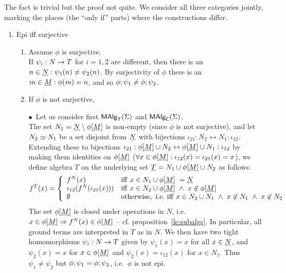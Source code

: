 \documentclass[10pt]{article}
\begin{document}
\begin{Proof} 
The fact is trivial but the proof not quite. We consider all three
categories jointly, marking the places (the ``only if'' parts) where
the constructions differ.

\begin{enumerate}\MyLPar
\item 
Epi iff surjective

\begin{enumerate}\MyLPar

\item %

Assume $\phi$ is surjective. \\ 
If $\psi_i:N\rightarrow T$ for $i=1,2$ are different, then there is an
$n\in\underline {N}: \psi_1(n)\not=\psi_2(n)$.  By surjectivity of $\phi$
there is an $m\in\underline {M}:\phi(m)=n$, and so
$\phi;\psi_1\not=\phi;\psi_2$.

\item %

If $\phi$ is not surjective, 

$\bullet$\ Let us consider first $\mbox{\rm\sf MAlg}_{\sf T}(\Sigma)$ and $\mbox{\rm\sf MAlg}_{\sf C}(\Sigma)$.\\
The set $N_1=\underline {N}\setminus\phi[\underline {M}]$ is non-empty (since
$\phi$ is not surjective), and let $N_2\mathrel{\simeq} N_1$ be a set disjoint
from $\underline {N}$ with bijections $\iota_{21}:N_2\leftrightarrow
N_1:\iota_{12}$. Extending these to bijections $\iota_{21}:\phi[\underline {M}]\cup N_2\leftrightarrow \phi[\underline {M}]\cup N_1:\iota_{12}$ by making
them identities on $\phi[\underline {M}]$ ($\forall x\in\phi[\underline {M}]:\iota_{12}(x)=\iota_{21}(x)=x$), we define algebra $T$ on the
underlying set $\underline {T}=N_1\cup\phi[\underline {M}]\cup N_2$ as follows:
\[
f^T(x) = 
\left\{ \begin{array}{ll}
    f^N(x) & 
        {\rm iff\ } x\in N_1\cup\phi[\under M]\ =\under N \\
   \iota_{12}(f^N(\iota_{21}(x))) & 
        {\rm iff\ } x\in N_2\cup\phi[\under M]\
        \land\ x\not\in\phi[\under M] \\
   \es & 
        {\rm otherwise,\ i.e.\ iff\ } x\in N_2\cup N_1\ 
        \land\ x\not\in N_1\ \land\ x\not\in N_2 \\
\end{array}\right.
\]
%
The set $\phi[\underline {M}]$ is closed under operations in $N$, i.e.\ 
$x\in\phi[\underline {M}]\Rightarrow f^N(x)\in\phi[\underline {M}]$ -- cf.  proposition~\ref{le:subalgs}.  In particular, all ground
terms are interpreted in $T$ as in $N$.  We then have two tight
homomorphisms $\psi_i:N\rightarrow T$ given by $\psi_1(x)=x$ for all
$x\in\underline {N}$, and $\psi_2(x)=x$ for $x\in\phi[\underline {M}]$ and
$\psi_2(x)=\iota_{12}(x)$ for $x\in N_1$.  Thus $\psi_1\not=\psi_2$
but $\phi;\psi_1=\phi;\psi_2$, i.e.\ $\phi$ is not epi.


\end{enumerate}
\end{enumerate}
\end{Proof}
\end{document}
